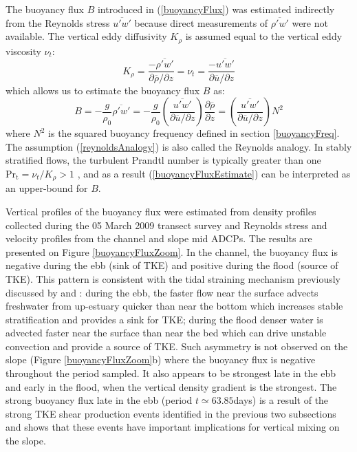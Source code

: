 The buoyancy flux $B$ introduced in (\ref{buoyancyFlux}) was estimated indirectly from the Reynolds stress $\overline{u' w'}$ because direct measurements of $\overline{\rho' w'}$ were not available. The vertical eddy diffusivity $K_\rho$ is assumed equal to the vertical eddy viscosity $\nu_t$:
\begin{equation}
\label{reynoldsAnalogy}
K_\rho = \frac{-\overline{\rho' w'}}{\partial \overline{\rho} / \partial z} = \nu_t  = \frac{-\overline{u' w'}}{\partial \overline{u} / \partial z} 
\end{equation}
which allows us to estimate the buoyancy flux $B$ as:
\begin{equation}
\label{buoyancyFluxEstimate}
B = - \frac{g}{\rho_0} \overline{\rho' w'} =  - \frac{g}{\rho_0} \left( \frac{\overline{u' w'}}{\partial \overline{u} / \partial z}  \right) \frac{\partial \overline{\rho}}{\partial z} =  \left( \frac{\overline{u' w'}}{\partial \overline{u} / \partial z}  \right) N^2
\end{equation}
where $N^2$ is the squared buoyancy frequency defined in section \ref{buoyancyFreq}. The assumption (\ref{reynoldsAnalogy}) is also called the Reynolds analogy. In stably stratified flows, the turbulent Prandtl number is typically greater than one $\mathrm{Pr_t} = \nu_t / K_\rho > 1$ \parencite{Kundu:2008p6122}, and as a result (\ref{buoyancyFluxEstimate}) can be interpreted as an upper-bound for $B$.

Vertical profiles of the buoyancy flux were estimated from density profiles collected during the 05 March 2009 transect survey and Reynolds stress and velocity profiles from the channel and slope mid ADCPs. The results are presented on Figure \ref{buoyancyFluxZoom}. In the channel, the buoyancy flux is negative during the ebb (sink of TKE) and positive during the flood (source of TKE). This pattern is consistent with the tidal straining mechanism previously discussed by \textcite{Rippeth:2001p5568} and \textcite{Stacey:2012p5324}:  during the ebb, the faster flow near the surface advects freshwater from up-estuary quicker than near the bottom which increases stable stratification and provides a sink for TKE; during the flood denser water is advected faster near the surface than near the bed which can drive unstable convection and provide a source of TKE. Such asymmetry is not observed on the slope (Figure \ref{buoyancyFluxZoom}b) where the buoyancy flux is negative throughout the period sampled. It also appears to be strongest late in the ebb and early in the flood, when the vertical density gradient is the strongest. The strong buoyancy flux late in the ebb (period $t\simeq63.85$days) is a result of the strong TKE shear production events identified in the previous two subsections and shows that these events have important implications for vertical mixing on the slope.

